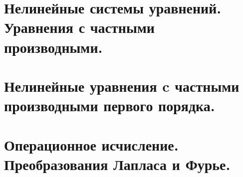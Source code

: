 \documentclass[fleqn, 12pt, a4paper, titlepage]{extarticle}
\begin{document}
		\section*{Нелинейные системы уравнений. Уравнения с частными производными.}
		


		\section*{Нелинейные уравнения c частными производными первого порядка.}
		


		\section*{Операционное исчисление. Преобразования Лапласа и Фурье.}
		

\end{document}
